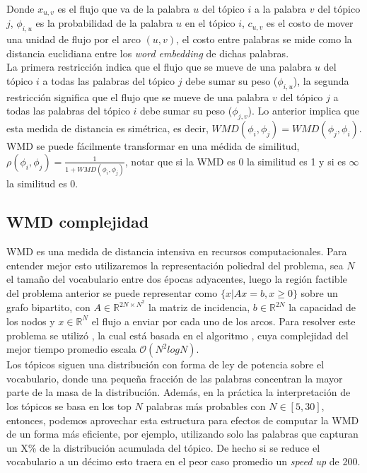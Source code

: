 Donde $x_{u,v}$ es el flujo que va de la palabra $u$ del tópico $i$ a la palabra $v$ del tópico $j$, $\phi_{i,u}$ es la probabilidad de la palabra $u$ en el tópico $i$, $c_{u,v}$ es el costo de mover una unidad de flujo por el arco $(u,v)$, el costo entre palabras se mide como la distancia euclidiana entre los \textit{word embedding} de dichas palabras.\\

La primera restricción indica que el flujo que se mueve de una palabra $u$ del tópico $i$ a todas las palabras del tópico $j$ debe sumar su peso ($\phi_{i,u}$), la segunda restricción significa que el flujo que se mueve de una palabra $v$ del tópico $j$ a todas las palabras del tópico $i$ debe sumar su peso ($\phi_{j,v}$). Lo anterior implica que esta medida de distancia es simétrica, es decir, $WMD(\phi_{i}, \phi_{j}) = WMD(\phi_{j}, \phi_{i})$.\\

WMD se puede fácilmente transformar en una médida de similitud, $\rho(\phi_{i}, \phi_{j}) = \frac{1}{1+WMD(\phi_{i}, \phi_{j})}$, notar que si la WMD es 0 la similitud es 1 y si es $\infty$ la similitud es 0. \\

\subsection{WMD complejidad}

WMD es una medida de distancia intensiva en recursos computacionales. Para entender mejor esto utilizaremos la representación poliedral del problema, sea $N$ el tamaño del vocabulario entre dos épocas adyacentes, luego la región factible del problema anterior se puede representar como $\{x| Ax=b, x\geq 0\}$ sobre un grafo bipartito, con $A\in \mathbb{R}^{2N\times N^{2}}$ la matriz de incidencia, $b\in \mathbb{R}^{2N}$ la capacidad de los nodos y $x\in \mathbb{R}^{N}$ el flujo a enviar por cada uno de los arcos. Para resolver este problema se utilizó \citep{PyEMD}, la cual está basada en el algoritmo \citep{pele2009fast}, cuya complejidad del mejor tiempo promedio escala $\mathcal{O}(N^{2}log N)$.\\

Los tópicos siguen una distribución con forma de ley de potencia sobre el vocabulario, donde una pequeña fracción de las palabras concentran la mayor parte de la masa de la distribución. Además, en la práctica la interpretación de los tópicos se basa en los top $N$ palabras más probables con $N \in [5, 30]$, entonces, podemos aprovechar esta estructura para efectos de computar la WMD de un forma más eficiente, por ejemplo, utilizando solo las palabras que capturan un X\% de la distribución acumulada del tópico. De hecho si se reduce el vocabulario a un décimo esto traera en el peor caso promedio un \textit{speed up} de 200.\\

